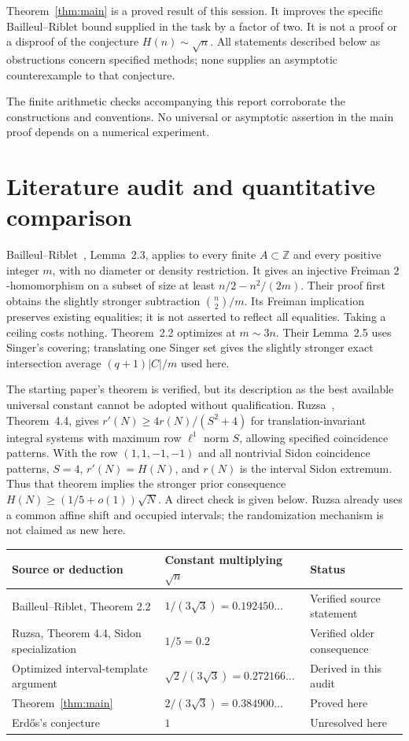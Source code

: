 \documentclass[11pt]{article}
\theoremstyle{definition}
\theoremstyle{remark}
\newcommand{\Z}{\mathbb Z}
\begin{document}
Theorem~\ref{thm:main} is a proved result of this session. It improves the
specific Bailleul--Riblet bound supplied in the task by a factor of two.
It is not a proof or a disproof of the conjecture $H(n)\sim\sqrt n$.
All statements described below as obstructions concern specified methods;
none supplies an asymptotic counterexample to that conjecture.

The finite arithmetic checks accompanying this report corroborate the
constructions and conventions. No universal or asymptotic assertion in
the main proof depends on a numerical experiment.

\section{Literature audit and quantitative comparison}

Bailleul--Riblet~\cite{BR}, Lemma~2.3, applies to every finite
$A\subset\Z$ and every positive integer $m$, with no diameter or density
restriction. It gives an injective Freiman $2$-homomorphism on a subset of
size at least $n/2-n^2/(2m)$. Their proof first obtains the slightly
stronger subtraction $\binom n2/m$. Its Freiman implication preserves
existing equalities; it is not asserted to reflect all equalities. Taking
a ceiling costs nothing. Theorem~2.2 optimizes at $m\sim3n$.
Their Lemma~2.5 uses Singer's covering; translating one Singer set gives
the slightly stronger exact intersection average $(q+1)|C|/m$ used here.

The starting paper's theorem is verified, but its description as the best
available universal constant cannot be adopted without qualification.
Ruzsa~\cite{RuzsaII}, Theorem~4.4, gives $r'(N)\ge4r(N)/(S^2+4)$ for
translation-invariant integral systems with maximum row $\ell^1$ norm
$S$, allowing specified coincidence patterns. With the row
$(1,1,-1,-1)$ and all nontrivial Sidon coincidence patterns, $S=4$,
$r'(N)=H(N)$, and $r(N)$ is the interval Sidon extremum. Thus that
theorem implies the stronger prior consequence
$H(N)\ge(1/5+o(1))\sqrt N$. A direct check is given below.
Ruzsa already uses a common affine shift and occupied intervals; the
randomization mechanism is not claimed as new here.

\begin{center}
\begin{tabular}{@{}lll@{}}
\toprule
Source or deduction & Constant multiplying $\sqrt n$ & Status\\
\midrule
Bailleul--Riblet, Theorem 2.2 & $1/(3\sqrt3)=0.192450\ldots$ & Verified source statement\\
Ruzsa, Theorem 4.4, Sidon specialization & $1/5=0.2$ & Verified older consequence\\
Optimized interval-template argument & $\sqrt2/(3\sqrt3)=0.272166\ldots$ & Derived in this audit\\
Theorem~\ref{thm:main} & $2/(3\sqrt3)=0.384900\ldots$ & Proved here\\
Erd\H{o}s's conjecture & $1$ & Unresolved here\\
\bottomrule
\end{tabular}
\end{center}
\end{document}
